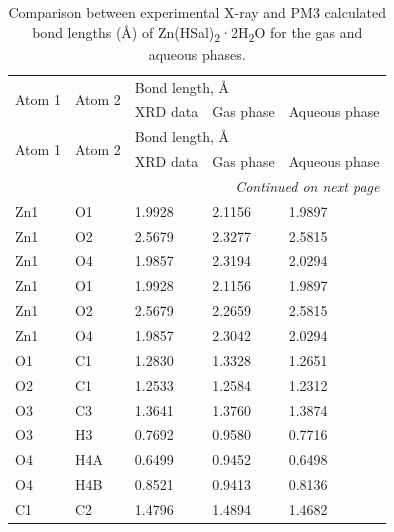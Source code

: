 \begin{longtable}{|l|l|lll|}
\caption{Comparison between experimental X-ray and PM3 calculated bond lengths (Å) of Zn(HSal)\textsubscript{2}·2H\textsubscript{2}O for the gas and aqueous phases.} \\
\hline
\multirow{2}{*}{Atom 1} & \multirow{2}{*}{Atom 2} & \multicolumn{3}{l|}{Bond length, Å} \\ \cline{3-5} 
 &  & \multicolumn{1}{l|}{XRD data} & \multicolumn{1}{l|}{Gas phase} & Aqueous phase \\ \hline
\endfirsthead
\hline
\multirow{2}{*}{Atom 1} & \multirow{2}{*}{Atom 2} & \multicolumn{3}{l|}{Bond length, Å} \\ \cline{3-5} 
 &  & \multicolumn{1}{l|}{XRD data} & \multicolumn{1}{l|}{Gas phase} & Aqueous phase \\ \hline
\endhead
\hline \multicolumn{5}{|r|}{\textit{Continued on next page}} \\ \hline
\endfoot
\hline
\endlastfoot
Zn1 & O1 & \multicolumn{1}{l|}{1.9928} & \multicolumn{1}{l|}{2.1156} & 1.9897 \\ \hline
Zn1 & O2 & \multicolumn{1}{l|}{2.5679} & \multicolumn{1}{l|}{2.3277} & 2.5815 \\ \hline
Zn1 & O4 & \multicolumn{1}{l|}{1.9857} & \multicolumn{1}{l|}{2.3194} & 2.0294 \\ \hline
Zn1 & O1 & \multicolumn{1}{l|}{1.9928} & \multicolumn{1}{l|}{2.1156} & 1.9897 \\ \hline
Zn1 & O2 & \multicolumn{1}{l|}{2.5679} & \multicolumn{1}{l|}{2.2659} & 2.5815 \\ \hline
Zn1 & O4 & \multicolumn{1}{l|}{1.9857} & \multicolumn{1}{l|}{2.3042} & 2.0294 \\ \hline
O1 & C1 & \multicolumn{1}{l|}{1.2830} & \multicolumn{1}{l|}{1.3328} & 1.2651 \\ \hline
O2 & C1 & \multicolumn{1}{l|}{1.2533} & \multicolumn{1}{l|}{1.2584} & 1.2312 \\ \hline
O3 & C3 & \multicolumn{1}{l|}{1.3641} & \multicolumn{1}{l|}{1.3760} & 1.3874 \\ \hline
O3 & H3 & \multicolumn{1}{l|}{0.7692} & \multicolumn{1}{l|}{0.9580} & 0.7716 \\ \hline
O4 & H4A & \multicolumn{1}{l|}{0.6499} & \multicolumn{1}{l|}{0.9452} & 0.6498 \\ \hline
O4 & H4B & \multicolumn{1}{l|}{0.8521} & \multicolumn{1}{l|}{0.9413} & 0.8136 \\ \hline
C1 & C2 & \multicolumn{1}{l|}{1.4796} & \multicolumn{1}{l|}{1.4894} & 1.4682 \\ \hline

\end{longtable}
